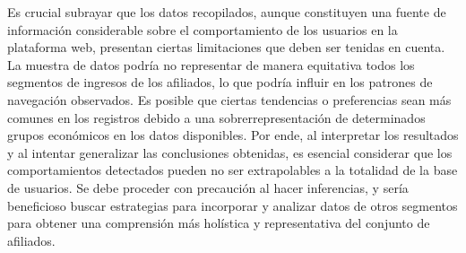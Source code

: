 Es crucial subrayar que los datos recopilados, aunque constituyen una fuente de información considerable sobre el comportamiento de los usuarios en la plataforma web, presentan ciertas limitaciones que deben ser tenidas en cuenta. La muestra de datos podría no representar de manera equitativa todos los segmentos de ingresos de los afiliados, lo que podría influir en los patrones de navegación observados. Es posible que ciertas tendencias o preferencias sean más comunes en los registros debido a una sobrerrepresentación de determinados grupos económicos en los datos disponibles. Por ende, al interpretar los resultados y al intentar generalizar las conclusiones obtenidas, es esencial considerar que los comportamientos detectados pueden no ser extrapolables a la totalidad de la base de usuarios. Se debe proceder con precaución al hacer inferencias, y sería beneficioso buscar estrategias para incorporar y analizar datos de otros segmentos para obtener una comprensión más holística y representativa del conjunto de afiliados.